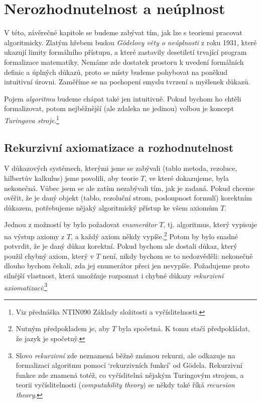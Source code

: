 \chapter{Nerozhodnutelnost a neúplnost}

V této, závěrečné kapitole se budeme zabývat tím, jak lze s teoriemi pracovat algoritmicky. Zlatým hřebem budou \emph{Gödelovy věty o neúplnosti} z roku 1931, které ukazují limity formálního přístupu, a které zastavily desetiletí trvající program formalizace matematiky. Nemáme zde dostatek prostoru k uvedení formálních definic a úplných důkazů, proto se místy budeme pohybovat na poněkud intuitivní úrovni. Zaměříme se na pochopení smyslu tvrzení a myšlenek důkazů.

Pojem \emph{algoritmu} budeme chápat také jen intuitivně. Pokud bychom ho chtěli formalizovat, potom nejběžnější (ale zdaleka ne jedinou) volbou je koncept \emph{Turingova stroje}.\footnote{Viz přednáška NTIN090 Základy složitosti a vyčíslitelnosti.}

\section{Rekurzivní axiomatizace a rozhodnutelnost}

V důkazových systémech, kterými jsme se zabývali (tablo metoda, rezoluce, hilbertův kalkulus) jsme povolili, aby teorie $T$, ve které dokazujeme, byla nekonečná. Vůbec jsem se ale zatím nezabývali tím, jak je zadaná. Pokud chceme ověřit, že je daný objekt (tablo, rezoluční strom, posloupnost formulí) korektním důkazem, potřebujeme nějaký algoritmický přístup ke všem axiomům $T$. 

Jednou z možností by bylo požadovat \emph{enumerátor} $T$, tj. algoritmus, který vypisuje na výstup axiomy z $T$, a každý axiom někdy vypíše.\footnote{Nutným předpokladem je, aby $T$ byla spočetná. K tomu stačí předpokládat, že jazyk je spočetný.} Potom by bylo snadné potvrdit, že je daný důkaz korektní. Pokud bychom ale dostali důkaz, který použil chybný axiom, který v $T$ není, nikdy bychom se to nedozvěděli: nekonečně dlouho bychom čekali, zda jej enumerátor přeci jen nevypíše. Požadujeme proto silnější vlastnost, která umožňuje rozpoznat i chybné důkazy \emph{rekurzivní axiomatizaci}:\footnote{Slovo \emph{rekurzivní} zde neznamená běžně známou rekurzi, ale odkazuje na formalizaci algoritmu pomocí `rekurzivních funkcí' od Gödela. Rekurzivní funkce zde znamená totéž, co vyčíslitelná nějakým Turingovým strojem, a teorii vyčíslitelnosti (\emph{computability theory}) se někdy také říká \emph{recursion theory}.}

